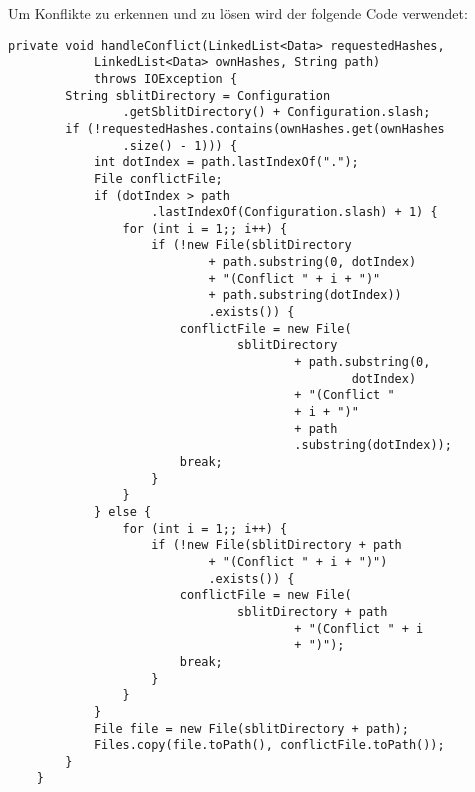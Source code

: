 Um Konflikte zu erkennen und zu lösen wird der folgende Code verwendet:
\javalisting
\begin{minipage}{\linewidth}
\begin{lstlisting}[caption={Erkennen eines Konflikts},captionpos=b]
private void handleConflict(LinkedList<Data> requestedHashes,
			LinkedList<Data> ownHashes, String path)
			throws IOException {
		String sblitDirectory = Configuration
				.getSblitDirectory() + Configuration.slash;
		if (!requestedHashes.contains(ownHashes.get(ownHashes
				.size() - 1))) {
			int dotIndex = path.lastIndexOf(".");
			File conflictFile;
			if (dotIndex > path
					.lastIndexOf(Configuration.slash) + 1) {
				for (int i = 1;; i++) {
					if (!new File(sblitDirectory
							+ path.substring(0, dotIndex)
							+ "(Conflict " + i + ")"
							+ path.substring(dotIndex))
							.exists()) {
						conflictFile = new File(
								sblitDirectory
										+ path.substring(0,
												dotIndex)
										+ "(Conflict "
										+ i + ")"
										+ path
										.substring(dotIndex));
						break;
					}
				}
			} else {
				for (int i = 1;; i++) {
					if (!new File(sblitDirectory + path
							+ "(Conflict " + i + ")")
							.exists()) {
						conflictFile = new File(
								sblitDirectory + path
										+ "(Conflict " + i
										+ ")");
						break;
					}
				}
			}
			File file = new File(sblitDirectory + path);
			Files.copy(file.toPath(), conflictFile.toPath());
		}
	}

\end{lstlisting}
\end{minipage}
